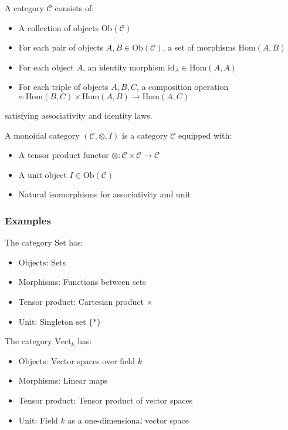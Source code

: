\begin{definition}[Category]
A category $\mathcal{C}$ consists of:
\begin{itemize}
\item A collection of objects $\text{Ob}(\mathcal{C})$
\item For each pair of objects $A, B \in \text{Ob}(\mathcal{C})$, a set of morphisms $\text{Hom}(A,B)$
\item For each object $A$, an identity morphism $\text{id}_A \in \text{Hom}(A,A)$
\item For each triple of objects $A, B, C$, a composition operation $\circ: \text{Hom}(B,C) \times \text{Hom}(A,B) \to \text{Hom}(A,C)$
\end{itemize}
satisfying associativity and identity laws.
\end{definition}

\begin{definition}
A monoidal category $(\mathcal{C}, \otimes, I)$ is a category $\mathcal{C}$ equipped with:
\begin{itemize}
\item A tensor product functor $\otimes: \mathcal{C} \times \mathcal{C} \to \mathcal{C}$
\item A unit object $I \in \text{Ob}(\mathcal{C})$
\item Natural isomorphisms for associativity and unit
\end{itemize}
\end{definition}

\subsubsection{Examples}

\begin{example}
The category $\text{Set}$ has:
\begin{itemize}
\item Objects: Sets
\item Morphisms: Functions between sets
\item Tensor product: Cartesian product $\times$
\item Unit: Singleton set $\{*\}$
\end{itemize}
\end{example}

\begin{example}
The category $\text{Vect}_k$ has:
\begin{itemize}
\item Objects: Vector spaces over field $k$
\item Morphisms: Linear maps
\item Tensor product: Tensor product of vector spaces
\item Unit: Field $k$ as a one-dimensional vector space
\end{itemize}
\end{example}

